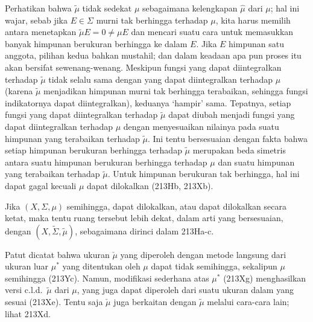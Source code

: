 {Perhatikan bahwa $\tilde\mu$ tidak sedekat $\mu$ sebagaimana kelengkapan
$\hat\mu$ dari $\mu$;  hal ini wajar, sebab jika $E\in\Sigma$ murni tak berhingga terhadap
$\mu$, kita harus memilih antara menetapkan $\tilde\mu E=0\ne\mu E$ dan
mencari suatu cara untuk memasukkan banyak himpunan berukuran berhingga ke
dalam $E$. Jika $E$ himpunan satu anggota, pilihan kedua bahkan mustahil; dan
dalam keadaan apa pun proses itu akan bersifat sewenang-wenang.
Meskipun fungsi yang dapat diintegralkan terhadap $\tilde\mu$ tidak selalu
sama dengan yang dapat diintegralkan terhadap $\mu$ (karena $\tilde\mu$
menjadikan himpunan murni tak berhingga terabaikan, sehingga fungsi indikatornya
dapat diintegralkan), keduanya `hampir' sama. Tepatnya, setiap fungsi yang dapat
diintegralkan terhadap $\tilde\mu$ dapat diubah menjadi fungsi yang dapat
diintegralkan terhadap $\mu$ dengan menyesuaikan nilainya pada suatu himpunan
yang terabaikan terhadap $\tilde\mu$.   Ini tentu bersesuaian dengan fakta
bahwa setiap himpunan berukuran berhingga terhadap $\tilde\mu$ merupakan beda
simetris antara suatu himpunan berukuran berhingga terhadap $\mu$ dan suatu
himpunan yang terabaikan terhadap $\tilde\mu$.   Untuk himpunan berukuran tak
berhingga, hal ini dapat gagal kecuali $\mu$ dapat dilokalkan (213Hb, 213Xb).

Jika $(X,\Sigma,\mu)$ semihingga, dapat dilokalkan, atau dapat dilokalkan
secara ketat, maka tentu ruang tersebut lebih dekat, dalam arti yang
bersesuaian, dengan $(X,\tilde\Sigma,\tilde\mu)$, sebagaimana dirinci dalam
213Ha-c.

Patut dicatat bahwa ukuran $\check\mu$ yang diperoleh dengan metode
\Caratheodory langsung dari ukuran luar $\mu^*$ yang ditentukan oleh $\mu$ dapat
tidak semihingga, sekalipun $\mu$ semihingga (213Yc). Namun, modifikasi
sederhana atas $\mu^*$ (213Xg) menghasilkan versi c.l.d.\ $\tilde\mu$ dari
$\mu$, yang juga dapat diperoleh dari suatu ukuran dalam yang sesuai (213Xe).
Tentu saja $\check\mu$ juga berkaitan dengan $\tilde\mu$ melalui cara-cara
lain;  lihat 213Xd.
}%

\discrpage




